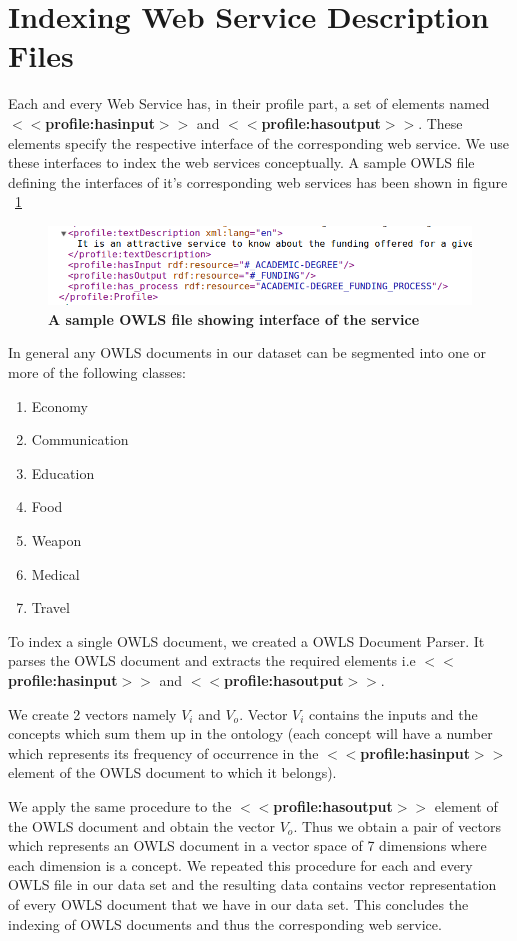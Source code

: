 \documentclass[12pt, twoside]{book}
\begin{document}
\section{Indexing Web Service Description Files}
Each and every Web Service has, in their profile part, a set of elements named \textbf{$<<$profile:hasinput$>>$} and \textbf{$<<$profile:hasoutput$>>$}. These elements specify the respective interface of the corresponding web service. We use these interfaces to index the web services conceptually. A sample OWLS file defining the interfaces of it's corresponding web services has been shown in figure ~\ref{fig: owl}
\begin{figure}
 \centering
 \includegraphics[width=\textwidth]{pics/sample_owls.png}
 \caption{\textbf{A sample OWLS file showing interface of the service}}
 \label{fig: owl}
\end{figure}
\par
In general any OWLS documents in our dataset can be segmented into one or more of the following classes:
\begin{enumerate}
 \item Economy
 \item Communication
 \item Education
 \item Food
 \item Weapon
 \item Medical
 \item Travel
\end{enumerate}

To index a single OWLS document, we created a OWLS Document Parser. It parses the OWLS document and extracts the required elements i.e \textbf{$<<$profile:hasinput$>>$} and \textbf{$<<$profile:hasoutput$>>$}. \\ \par
We create 2 vectors namely $V_{i}$ and $V_{o}$. Vector $V_{i}$ contains the inputs and the concepts which sum them up in the ontology (each concept will have a number which represents its frequency of occurrence in the \textbf{$<<$profile:hasinput$>>$} element of the OWLS document to which it belongs). \\ \par
We apply the same procedure to the \textbf{$<<$profile:hasoutput$>>$} element of the OWLS document and obtain the vector $V_{o}$. Thus we obtain a pair of vectors which represents an OWLS document in a vector space of 7 dimensions where each dimension is a concept. We repeated this procedure for each and every OWLS file in our data set and the resulting data contains vector representation of every OWLS document that we have in our data set. This concludes the indexing of OWLS documents and thus the corresponding web service.
\end{document}
